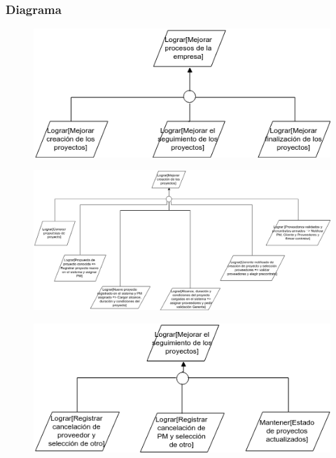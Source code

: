 \subsubsection{Diagrama}

\begin{figure}[H]
    \centering
    \includegraphics[width=\textwidth]{imagenes/objetivos-principales.png}
\end{figure}

\vspace{1em}

\begin{figure}[H]
    \centering
    \includegraphics[width=\textwidth, keepaspectratio, angle=90]{imagenes/objetivos-creacion-principal.png}
\end{figure}

\vspace{1em}

\begin{figure}[H]
    \centering
    \includegraphics[width=\textwidth]{imagenes/objetivos-seguimiento-principal.png}
\end{figure}

